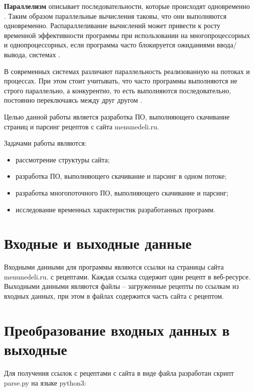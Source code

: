 
\textbf{Параллелизм} описывает последовательности, которые происходят одновременно \cite{posix-threads}. Таким образом параллельные вычисления таковы, что они выполняются одновременно. Распараллеливание вычислений может привести к росту временной эффективности программы при использовании на многопроцессорных и однопроцессорных, если программа часто блокируется ожиданиями ввода/вывода, системах \cite{tanenbaum}.

В современных системах различают параллельность реализованную на потоках и процессах. При этом стоит учитывать, что часто программы выполняются не строго параллельно, а конкурентно, то есть выполняются последовательно, постоянно переключаясь между друг другом \cite{tanenbaum}.

Целью данной работы является разработка ПО, выполняющего скачивание страниц и парсинг рецептов с сайта menunedeli.ru.

Задачами работы являются:

\begin{itemize}
	\item рассмотрение структуры сайта;
	\item разработка ПО, выполняющего скачивание и парсинг в одном потоке;
	\item разработка многопоточного ПО, выполняющего скачивание и парсинг;
	\item исследование временных характеристик разработанных программ.
\end{itemize}
\vspace{20mm}
{\let\clearpage\relax \chapter{Входные и выходные данные}}

Входными данными для программы являются ссылки на страницы сайта menunedeli.ru. с рецептами. Каждая ссылка содержит один рецепт в веб-ресурсе. Выходными данными являются файлы -- загруженные рецепты по ссылкам из входных данных, при этом в файлах содержится часть сайта с рецептом.

\vspace{20mm}
{\let\clearpage\relax \chapter{Преобразование входных данных в выходные}}

Для получения ссылок с рецептами с сайта в виде файла разработан скрипт parse.py на языке python3:

